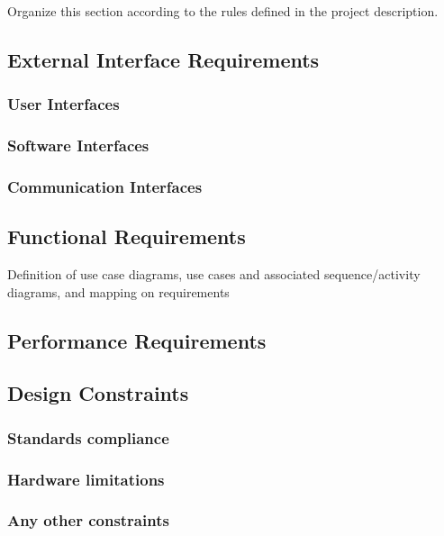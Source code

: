 Organize this section according to the rules defined in the project description. 
\subsection{External Interface Requirements}
\subsubsection{User Interfaces}
\subsubsection{Software Interfaces}
\subsubsection{Communication Interfaces}
\subsection{Functional Requirements}
Definition of use case diagrams, use cases and associated sequence/activity diagrams, and mapping on requirements


%
% 
%
% 
% 
% 


\subsection{Performance Requirements}
\subsection{Design Constraints}
\subsubsection{Standards compliance}
\subsubsection{Hardware limitations}
\subsubsection{Any other constraints}
